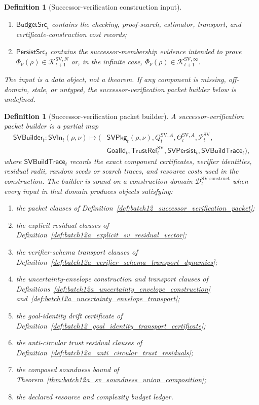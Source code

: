\documentclass[11pt]{article}
\newtheorem{definition}[theorem]{Definition}
\newcommand{\Pcal}{\mathcal{P}}
\newcommand{\1}{\mathbf{1}}
\providecommand{\Dcal}{\mathcal{D}}
\providecommand{\Kcal}{\mathcal{K}}
\begin{document}
\begin{definition}[Successor-verification construction input]
\begin{enumerate}[label=(\roman*),leftmargin=1.5em]
    \item \(\mathsf{BudgetSrc}_t\) contains the checking, proof-search, estimator, transport, and certificate-construction cost records;
    \item \(\mathsf{PersistSrc}_t\) contains the successor-membership evidence intended to prove \(\Phi_\nu(\rho)\in\Kcal_{t+1}^{\mathrm{SV},N}\) or, in the infinite case, \(\Phi_\nu(\rho)\in\Kcal_{t+1}^{\mathrm{SV},\infty}\).
\end{enumerate}
The input is a data object, not a theorem.  If any component is missing, off-domain, stale, or untyped, the successor-verification packet builder below is undefined.
\end{definition}

\begin{definition}[Successor-verification packet builder]
\label{def:batch12b_sv_packet_builder}
A successor-verification packet builder is a partial map
\[
\begin{aligned}
\mathsf{SVBuilder}_t:
\mathsf{SVIn}_t(\rho,\nu)
\longmapsto
(&\mathsf{SVPkg}_t(\rho,\nu),Q_t^{\mathrm{SV},A},
\Theta_t^{\mathrm{SV},A},\Pcal_t^{\mathrm{SV}},\\
&\mathsf{GoalId}_t,
\mathsf{TrustRef}_t^{\mathrm{SV}},
\mathsf{SVPersist}_t,
\mathsf{SVBuildTrace}_t),
\end{aligned}
\]
where \(\mathsf{SVBuildTrace}_t\) records the exact component certificates, verifier identities, residual radii, random seeds or search traces, and resource costs used in the construction.  The builder is \emph{sound on a construction domain} \(\Dcal_t^{\mathrm{SV\mbox{-}construct}}\) when every input in that domain produces objects satisfying:
\begin{enumerate}[label=(\roman*),leftmargin=1.5em]
    \item the packet clauses of Definition~\ref{def:batch12_successor_verification_packet};
    \item the explicit residual clauses of Definition~\ref{def:batch12a_explicit_sv_residual_vector};
    \item the verifier-schema transport clauses of Definition~\ref{def:batch12a_verifier_schema_transport_dynamics};
    \item the uncertainty-envelope construction and transport clauses of Definitions~\ref{def:batch12a_uncertainty_envelope_construction} and~\ref{def:batch12a_uncertainty_envelope_transport};
    \item the goal-identity drift certificate of Definition~\ref{def:batch12_goal_identity_transport_certificate};
    \item the anti-circular trust residual clauses of Definition~\ref{def:batch12a_anti_circular_trust_residuals};
    \item the composed soundness bound of Theorem~\ref{thm:batch12a_sv_soundness_union_composition};
    \item the declared resource and complexity budget ledger.
\end{enumerate}
\end{definition}
\end{document}
